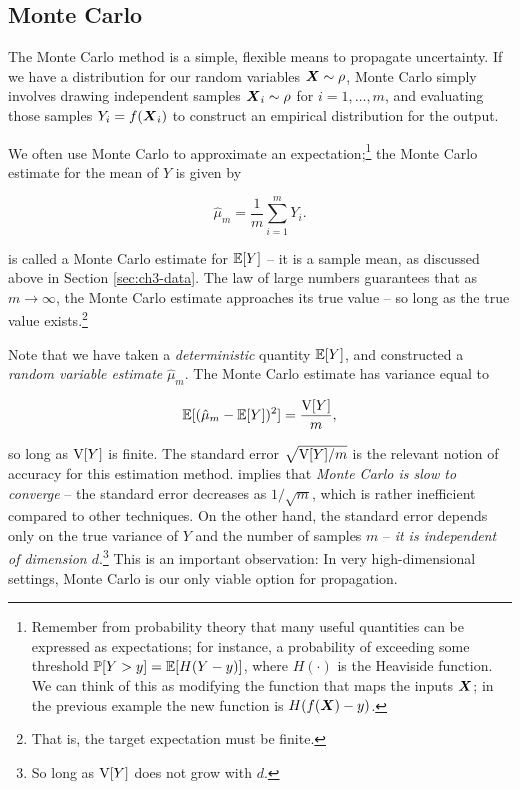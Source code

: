 \documentclass[../primer.tex]{subfiles}
\begin{document}
\subsection{Monte Carlo}
The Monte Carlo method is a simple, flexible means to propagate uncertainty. If
we have a distribution for our random variables $\boldsymbol{X}\sim\rho$, Monte Carlo
simply involves drawing independent samples $\boldsymbol{X}_i\sim\rho$ for $i=1,\dots,m$,
and evaluating those samples $Y_i = f(\boldsymbol{X}_i)$ to construct an empirical
distribution for the output.

We often use Monte Carlo to approximate an expectation;\footnote{Remember from
  probability theory that many useful quantities can be expressed as
  expectations; for instance, a probability of exceeding some threshold $\mathbb{P}[Y>y]
  = \mathbb{E}[H(Y-y)]$, where $H(\cdot)$ is the Heaviside function. We can think of
  this as modifying the function that maps the inputs $\boldsymbol{X}$; in the previous
  example the new function is $H(f(\boldsymbol{X})-y)$.} the Monte Carlo estimate for the
mean of $Y$ is given by

\begin{equation} \label{eq:ch4-mc-mean}
  \hat{\mu}_m = \frac{1}{m}\sum_{i=1}^m Y_i.
\end{equation}

\noindent {} is called a Monte Carlo estimate for $\mathbb{E}[Y]$ --
it is a sample mean, as discussed above in Section \ref{sec:ch3-data}. The law
of large numbers guarantees that as $m\to\infty$, the Monte Carlo estimate
approaches its true value -- so long as the true value
exists.\cite{owen2013montecarlo}\footnote{That is, the target expectation must
  be finite.}

Note that we have taken a \emph{deterministic} quantity $\mathbb{E}[Y]$, and constructed
a \emph{random variable estimate} $\hat{\mu}_m$. The Monte Carlo estimate has
variance equal to

\begin{equation} \label{eq:ch4-mc-var}
  \mathbb{E}[(\hat{\mu}_m - \mathbb{E}[Y])^2] = \frac{\mathrm{V}[Y]}{m},
\end{equation}

\noindent so long as $\mathrm{V}[Y]$ is finite. The standard error $\sqrt{\mathrm{V}[Y]/m}$ is
the relevant notion of accuracy for this estimation method. 
implies that \emph{Monte Carlo is slow to converge} -- the standard error
decreases as $1/\sqrt{m}$, which is rather inefficient compared to other
techniques. On the other hand, the standard error depends only on the true
variance of $Y$ and the number of samples $m$ -- \emph{it is independent of
  dimension $d$}.\footnote{So long as $\mathrm{V}[Y]$ does not grow with $d$.} This is
an important observation: In very high-dimensional settings, Monte Carlo is our
only viable option for propagation.
\end{document}

